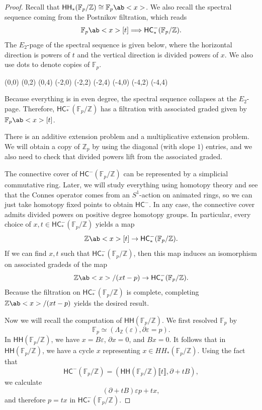 \documentclass[10pt, oneside]{memoir}
\theoremstyle{definition}
\theoremstyle{remark}
\theoremstyle{plain}
\theoremstyle{definition}
\theoremstyle{remark}
\newcommand{\Z}{\mathbb{Z}}
\newcommand{\F}{\mathbb{F}}
\newcommand{\ep}{\varepsilon}
\newcommand{\ms}[1]{\mathsf{#1}}
\newcommand{\1}{\mathbf{1}}
\newcommand{\2}{\mathbf{2}}
\newcommand{\3}{\mathbf{3}}
\newcommand{\ps}[1]{\llbracket #1 \rrbracket}
\newcommand{\HC}{\ms{HC}}
\newcommand{\HH}{\ms{HH}}
\begin{document}
\begin{proof}
    Recall that \(\HH_*(\F_p/\Z) \cong \F_p \ab<x> \). We also recall the spectral sequence coming from the Postnikov filtration, which reads
    \[ \F_p \ab<x>[t] \Longrightarrow \HC_*^-(\F_p / \Z). \]
    The \(E_2 \)-page of the spectral sequence is given below, where the horizontal direction is powers of \(t \) and the vertical direction is divided powers of \(x \). We also use dots to denote copies of \(\F_p \).
    \begin{center}
        \begin{sseqdata}[classes={draw=none}, name=omegas2, homological Serre
            grading, xscale=1, y axis gap = 2em, axes type = frame] 
            \class["\bullet"](0,0)
            \class["\bullet"](0,2) 
            \class["\bullet"](0,4) 
            \class["\bullet"](-2,0) 
            \class["\bullet"](-2,2) 
            \class["\bullet"](-2,4) 
            \class["\bullet"](-4,0) 
            \class["\bullet"](-4,2) 
            \class["\bullet"](-4,4)
        \end{sseqdata} 
        \printpage[name=omegas2, page=2] 
    \end{center} 
    Because everything is in even degree, the spectral sequence collapses at the \(E_2 \)-page. Therefore, \(\HC_*^-(\F_p/\Z) \) has a filtration with associated graded given by \(\F_p\ab<x> [t] \).

    There is an additive extension problem and a multiplicative extension problem. We will obtain a copy of \(\Z_p \) by using the diagonal (with slope \(1 \)) entries, and we also need to check that divided powers lift from the associated graded.

    The connective cover of \(\HC^-(\F_p/\Z) \) can be represented by a simplicial commutative ring. Later, we will study everything using homotopy theory and see that the Connes operator comes from an \(S^1 \)-action on animated rings, so we can just take homotopy fixed points to obtain \(\HC^- \). In any case, the connective cover admits divided powers on positive degree homotopy groups. In particular, every choice of \(x,t \in \HC_*^-(\F_p/\Z) \) yields a map
    \[ \Z\ab<x>[t] \to \HC_*^-(\F_p/\Z). \]
    If we can find \(x,t \) such that \(\HC_*^-(\F_p/\Z) \), then this map induces an isomorphism on associated gradeds of the map
    \[ \Z\ab<x>/(xt-p) \to \HC_*^-(\F_p/\Z). \]
    Because the filtration on \(\HC_*^-(\F_p/\Z) \) is complete, completing \(\Z\ab<x>/(xt-p) \) yields the desired result.

    Now we will recall the computation of \(\HH(\F_p/\Z) \). We first resolved \(\F_p \) by
    \[ \F_p \simeq (\Lambda_{\Z}(\ep), \partial \ep = p). \]
    In \(\HH(\F_p/\Z) \), we have \(x = B \ep \), \(\partial x = 0 \), and \(Bx = 0 \). It follows that in \(\HH(\F_p/\Z) \), we have a cycle \(x \) representing \(x \in HH_*(\F_p / \Z) \). Using the fact that
    \[ \HC^-(\F_p/\Z) = (\HH(\F_p/\Z)\ps{t}, \partial + tB),\]
    we calculate
    \[ (\partial + tB) \ep p + tx, \]
    and therefore \(p = tx \) in \(\HC_*^-(\F_p/\Z) \).
\end{proof}
\end{document}

